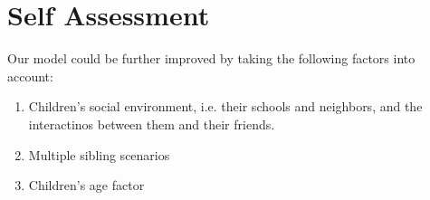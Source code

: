 \documentclass[article, 11pt, a4paper, onesize]{memoir}
\begin{document}
\section{Self Assessment}

Our model could be further improved by taking the following factors into account:

\begin{enumerate}
    \item Children's social environment, i.e. their schools and neighbors, and the
        interactinos between them and their friends.
    \item Multiple sibling scenarios
    \item Children's age factor
\end{enumerate}
\end{document}
